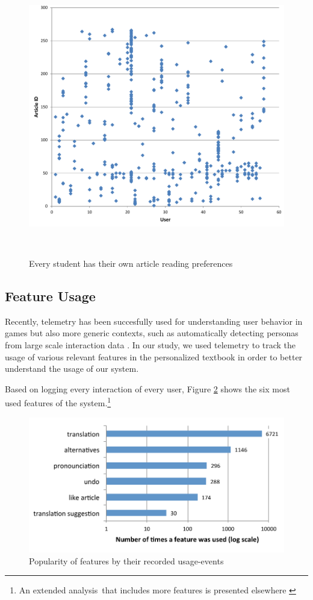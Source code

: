 \begin{figure}[h!]
\centering
  \includegraphics[width=0.9\columnwidth]{figures/users_articles}
  \caption{Every student has their own article reading preferences}~\label{fig:articles_read}
\end{figure}

\subsection{Feature Usage}
\newcommand{\feature}[1]{{\em #1}}
Recently, telemetry has been succesfully used for understanding user behavior in games \cite{Gagne11-telemetry} but also more generic contexts, such as automatically detecting personas from large scale interaction data \cite{Zhang16-telemetry}. In our study, we used telemetry to track the usage of various relevant features in the personalized textbook in order to better understand the usage of our system.

Based on logging every interaction of every user, Figure \ref{fig:feature_usage} shows the six most used features of the system.\footnote{An extended analysis that includes more features is presented elsewhere \cite{Chirtoaca17-apollo}}

  \begin{figure}[h!]
  \centering
    \includegraphics[width=0.9\columnwidth]{figures/reader_feature_usage}
    \caption{Popularity of features by their recorded usage-events}
    \label{fig:feature_usage}
  \end{figure}

